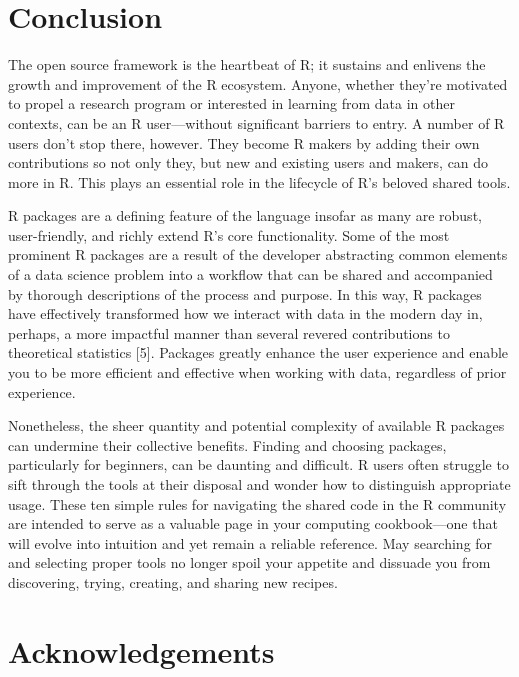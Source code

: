 \documentclass[10pt,letterpaper]{article}
\begin{document}
\hypertarget{conclusion}{%
\section{Conclusion}\label{conclusion}}

The open source framework is the heartbeat of R; it sustains and
enlivens the growth and improvement of the R ecosystem. Anyone, whether
they're motivated to propel a research program or interested in learning
from data in other contexts, can be an R user---without significant
barriers to entry. A number of R users don't stop there, however. They
become R makers by adding their own contributions so not only they, but
new and existing users and makers, can do more in R. This plays an
essential role in the lifecycle of R's beloved shared tools.

R packages are a defining feature of the language insofar as many are
robust, user-friendly, and richly extend R's core functionality. Some of
the most prominent R packages are a result of the developer abstracting
common elements of a data science problem into a workflow that can be
shared and accompanied by thorough descriptions of the process and
purpose. In this way, R packages have effectively transformed how we
interact with data in the modern day in, perhaps, a more impactful
manner than several revered contributions to theoretical statistics
{[}5{]}. Packages greatly enhance the user experience and enable you to
be more efficient and effective when working with data, regardless of
prior experience.

Nonetheless, the sheer quantity and potential complexity of available R
packages can undermine their collective benefits. Finding and choosing
packages, particularly for beginners, can be daunting and difficult. R
users often struggle to sift through the tools at their disposal and
wonder how to distinguish appropriate usage. These ten simple rules for
navigating the shared code in the R community are intended to serve as a
valuable page in your computing cookbook---one that will evolve into
intuition and yet remain a reliable reference. May searching for and
selecting proper tools no longer spoil your appetite and dissuade you
from discovering, trying, creating, and sharing new recipes.

\hypertarget{acknowledgements}{%
\section{Acknowledgements}\label{acknowledgements}}
\end{document}
